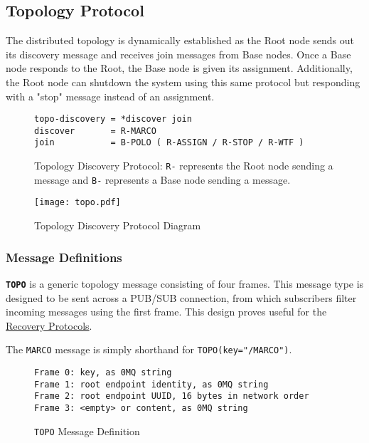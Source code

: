 \subsection{Topology Protocol}
\label{proto_topo}

The \dcamp distributed topology is dynamically established as the Root node sends out its discovery message and receives
join messages from Base nodes. Once a Base node responds to the Root, the Base node is given its assignment.
Additionally, the Root node can shutdown the system using this same protocol but responding with a "stop" message
instead of an assignment.

\begin{figure}[H]
\vspace{+10pt}
\begin{verbatim}
topo-discovery = *discover join
discover       = R-MARCO
join           = B-POLO ( R-ASSIGN / R-STOP / R-WTF )
\end{verbatim}
\vspace{-5pt}
\caption[Topology Discovery Protocol]
        {Topology Discovery Protocol: \texttt{R-} represents the Root node sending a message and \texttt{B-}
         represents a Base node sending a message.}
\label{fig:proto_topo_spec}
\end{figure}

\begin{figure}[H]
    \centering
    \texttt{[image: topo.pdf]}
    \label{fig:proto_topo_image}
    \caption{Topology Discovery Protocol Diagram}
\end{figure}

\subsubsection{Message Definitions}

\textbf{\texttt{TOPO}} is a generic topology message consisting of four frames. This message type is designed to be sent
across a PUB/SUB connection, from which subscribers filter incoming messages using the first frame. This design proves
useful for the \hyperref[proto_reco]{Recovery Protocols}.

The \texttt{MARCO} message is simply shorthand for \texttt{TOPO(key="/MARCO")}.

\begin{figure}[H]
\vspace{+10pt}
\begin{verbatim}
Frame 0: key, as 0MQ string
Frame 1: root endpoint identity, as 0MQ string
Frame 2: root endpoint UUID, 16 bytes in network order
Frame 3: <empty> or content, as 0MQ string
\end{verbatim}
\vspace{-20pt}
\caption{\texttt{TOPO} Message Definition}
\label{fig:message_topo}
\end{figure}


